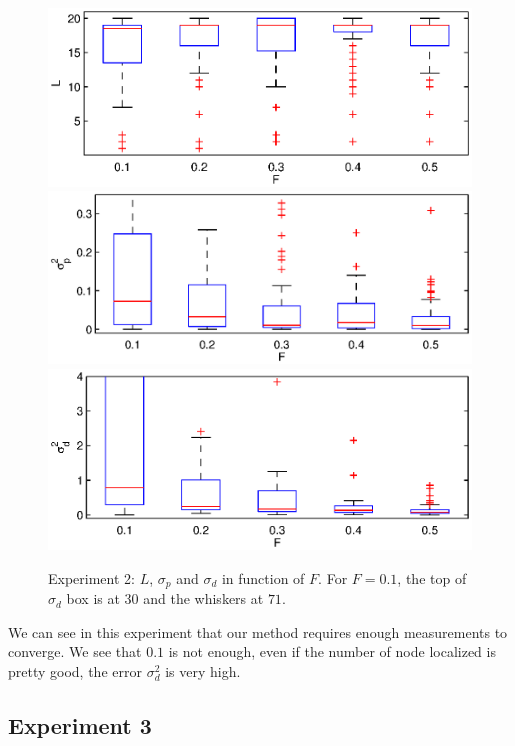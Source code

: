 \documentclass[letterpaper, 10 pt, conference]{ieeeconf}  %
\begin{document}
\begin{figure}[ht!]
\centering
\includegraphics[width=1\columnwidth]{set2-L-nosrf.eps}
\includegraphics[width=1\columnwidth]{set2-sp-nosrf-ylim.eps}
\includegraphics[width=1\columnwidth]{set2-sd-nosrf-ylim.eps}
\caption{\label{figure:set2}Experiment 2: $L$, $\sigma_p$ and $\sigma_d$ in function of $F$. For $F=0.1$, the top of $\sigma_d$ box is at $30$ and the whiskers at $71$.}
\end{figure}

We can see in this experiment that our method requires enough measurements to converge. We see that $0.1$ is not enough, even if the number of node localized is pretty good, the error $\sigma_d^2$ is very high.

\subsection{Experiment 3}
\end{document}
